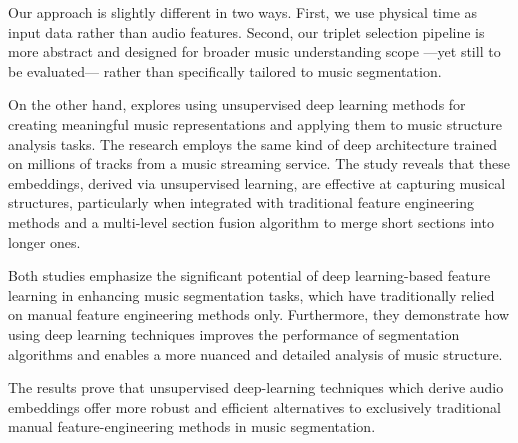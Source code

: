 Our approach is slightly different in two ways. First, we use physical time as input data rather than audio features. Second, our triplet selection pipeline is more abstract and designed for broader music understanding scope ---yet still to be evaluated--- rather than specifically tailored to music segmentation.

On the other hand, \cite{SalamonDeepSegmentation} explores using unsupervised deep learning methods for creating meaningful music representations and applying them to music structure analysis tasks. The research employs the same kind of deep architecture trained on millions of tracks from a music streaming service. The study reveals that these embeddings, derived via unsupervised learning, are effective at capturing musical structures, particularly when integrated with traditional feature engineering methods and a multi-level section fusion algorithm to merge short sections into longer ones. 

Both studies emphasize the significant potential of deep learning-based feature learning in enhancing music segmentation tasks, which have traditionally relied on manual feature engineering methods only. Furthermore, they demonstrate how using deep learning techniques improves the performance of segmentation algorithms and enables a more nuanced and detailed analysis of music structure. 

The results prove that unsupervised deep-learning techniques which derive audio embeddings offer more robust and efficient alternatives to exclusively traditional manual feature-engineering methods in music segmentation.

